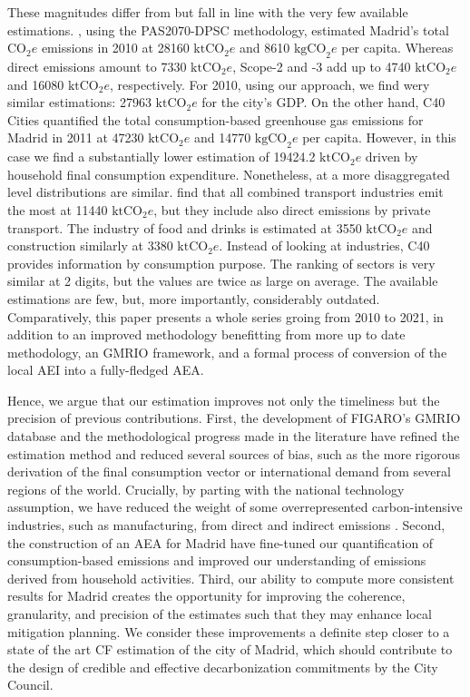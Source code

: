 \documentclass[
  10pt,
  twocolumn]{aft}
\begin{document}
These magnitudes differ from but fall in line with the very few
available estimations. \citet{andradeImplementingCitylevelCarbon2018},
using the PAS2070-DPSC methodology, estimated Madrid's total
\(\text{CO}_2e\) emissions in 2010 at 28160 \(\text{ktCO}_2e\) and 8610
\(\text{kgCO}_2e\) per capita. Whereas direct emissions amount to 7330
\(\text{ktCO}_2e\), Scope-2 and -3 add up to 4740 \(\text{ktCO}_2e\) and
16080 \(\text{ktCO}_2e\), respectively. For 2010, using our approach, we
find wery similar estimations: 27963 \(\text{ktCO}_2e\) for the city's
GDP. On the other hand, C40 Cities quantified the total
consumption-based greenhouse gas emissions for Madrid in 2011 at 47230
\(\text{ktCO}_2e\) and 14770 \(\text{kgCO}_2e\) per capita. However, in
this case we find a substantially lower estimation of 19424.2
\(\text{ktCO}_2e\) driven by household final consumption expenditure.
Nonetheless, at a more disaggregated level distributions are similar.
\citet{andradeImplementingCitylevelCarbon2018} find that all combined
transport industries emit the most at 11440 \(\text{ktCO}_2e\), but they
include also direct emissions by private transport. The industry of food
and drinks is estimated at 3550 \(\text{ktCO}_2e\) and construction
similarly at 3380 \(\text{ktCO}_2e\). Instead of looking at industries,
C40 provides information by consumption purpose. The ranking of sectors
is very similar at 2 digits, but the values are twice as large on
average. The available estimations are few, but, more importantly,
considerably outdated. Comparatively, this paper presents a whole series
groing from 2010 to 2021, in addition to an improved methodology
benefitting from more up to date methodology, an GMRIO framework, and a
formal process of conversion of the local AEI into a fully-fledged AEA.

Hence, we argue that our estimation improves not only the timeliness but
the precision of previous contributions. First, the development of
FIGARO's GMRIO database \citep{remond-tiedrez_eu_2019} and the
methodological progress made in the literature
\citep{cazcarro_linking_2022, wiedmann_concept_2016, corcoles_carbon_2024}
have refined the estimation method and reduced several sources of bias,
such as the more rigorous derivation of the final consumption vector or
international demand from several regions of the world. Crucially, by
parting with the national technology assumption, we have reduced the
weight of some overrepresented carbon-intensive industries, such as
manufacturing, from direct and indirect emissions
\citep{eea_environmental_2013}. Second, the construction of an AEA for
Madrid have fine-tuned our quantification of consumption-based emissions
and improved our understanding of emissions derived from household
activities. Third, our ability to compute more consistent results for
Madrid creates the opportunity for improving the coherence, granularity,
and precision of the estimates such that they may enhance local
mitigation planning. We consider these improvements a definite step
closer to a state of the art CF estimation of the city of Madrid, which
should contribute to the design of credible and effective
decarbonization commitments by the City Council.
\end{document}

